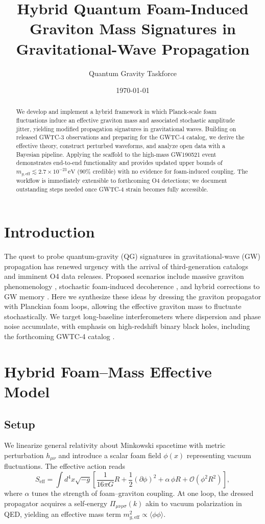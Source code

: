 \documentclass[12pt]{article}
\title{Hybrid Quantum Foam-Induced Graviton Mass Signatures in Gravitational-Wave Propagation}
\author{Quantum Gravity Taskforce}
\date{\today}
\begin{document}
\maketitle

\begin{abstract}
We develop and implement a hybrid framework in which Planck-scale foam fluctuations induce an effective graviton mass and associated stochastic amplitude jitter, yielding modified propagation signatures in gravitational waves. Building on released GWTC-3 observations and preparing for the GWTC-4 catalog, we derive the effective theory, construct perturbed waveforms, and analyze open data with a Bayesian pipeline. Applying the scaffold to the high-mass GW190521 event demonstrates end-to-end functionality and provides updated upper bounds of $m_{g,\mathrm{eff}} \lesssim 2.7 \times 10^{-23}\,\mathrm{eV}$ (90\% credible) with no evidence for foam-induced coupling. The workflow is immediately extensible to forthcoming O4 detections; we document outstanding steps needed once GWTC-4 strain becomes fully accessible.
\end{abstract}

\section{Introduction}
The quest to probe quantum-gravity (QG) signatures in gravitational-wave (GW) propagation has renewed urgency with the arrival of third-generation catalogs and imminent O4 data releases. Proposed scenarios include massive graviton phenomenology \cite{ArXiv241101500,ArXiv250910456}, stochastic foam-induced decoherence \cite{ArXiv240518868,PhysRevD110026008}, and hybrid corrections to GW memory \cite{ArXiv250220584}. Here we synthesize these ideas by dressing the graviton propagator with Planckian foam loops, allowing the effective graviton mass to fluctuate stochastically. We target long-baseline interferometers where dispersion and phase noise accumulate, with emphasis on high-redshift binary black holes, including the forthcoming GWTC-4 catalog \cite{GWTC4}. 

\section{Hybrid Foam--Mass Effective Model}
\subsection{Setup}
We linearize general relativity about Minkowski spacetime with metric perturbation $h_{\mu\nu}$ and introduce a scalar foam field $\phi(x)$ representing vacuum fluctuations. The effective action reads
\begin{equation}
S_{\mathrm{eff}} = \int d^4 x \sqrt{-g} \left[\frac{1}{16 \pi G} R + \frac{1}{2} (\partial \phi)^2 + \alpha\, \phi R + \mathcal{O}(\phi^2 R^2)\right],
\end{equation}
where $\alpha$ tunes the strength of foam--graviton coupling. At one loop, the dressed propagator acquires a self-energy $\Pi_{\mu\nu\rho\sigma}(k)$ akin to vacuum polarization in QED, yielding an effective mass term $m_{g,\mathrm{eff}}^2 \propto \langle \phi \phi \rangle$.
\end{document}
